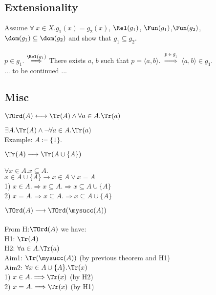 \documentclass[10pt,a4paper]{article}
\begin{document}
\subsection{Extensionality}
\begin{theorem}
Assume $\forall~x\in X. g_1(x)=g_2(x)$, $\Rel(g_1)$, $\Fun(g_1)$,$\Fun(g_2)$,\\ $\dom(g_1)\subseteq\dom(g_2)$ and show that $g_1\subseteq g_2$.\\
\myprf\\
$p\in g_1$.
$\stackrel{\Rel(g_1)}{\Longrightarrow}$
There exists $a$, $b$ such that $p=\langle a, b\rangle$.
$\stackrel{p\in g_1}{\Longrightarrow}$ $\langle a, b\rangle\in g_1$.
\\
... to be continued ...
\\\myqed 
\end{theorem}
\subsection{Misc}
\begin{definition}
$\TOrd(A) \longleftrightarrow \Tr(A)\land \forall a\in A. \Tr(a)$
\end{definition}
\begin{theorem}
$\exists A. \Tr(A) \land \neg \forall a\in A. \Tr(a)$
\\Example: $A\coloneqq \{1\}$.
\end{theorem}
\begin{theorem}
$\Tr(A) \longrightarrow \Tr(A\cup\{A\})$
\\\myprf
\\$\forall x\in A.x\subseteq A.$
\\$x\in A\cup\{A\} \longrightarrow x\in A \lor x=A$
\\1) $x\in A. \Longrightarrow x\subseteq A. \Longrightarrow x\subseteq A\cup\{A\}$
\\2) $x = A. \Longrightarrow x\subseteq A. \Longrightarrow x\subseteq A\cup\{A\}$
\\\myqed
\end{theorem}
\begin{theorem}
  $ \TOrd(A) \longrightarrow \TOrd(\mysucc(A))$
\\\myprf
\\From H:$\TOrd(A)$ we have:
\\H1: $\Tr(A)$
\\H2: $\forall a\in A. \Tr(a)$
\\Aim1: $\Tr(\mysucc(A))$ (by previous theorem and H1)
\\Aim2: $\forall x\in A\cup\{A\}. \Tr(x)$
\\1) $x\in A. \Longrightarrow \Tr(x)$ (by H2)
\\2) $x = A. \Longrightarrow \Tr(x)$ (by H1) %
\\\myqed
\end{theorem}
\end{document}
